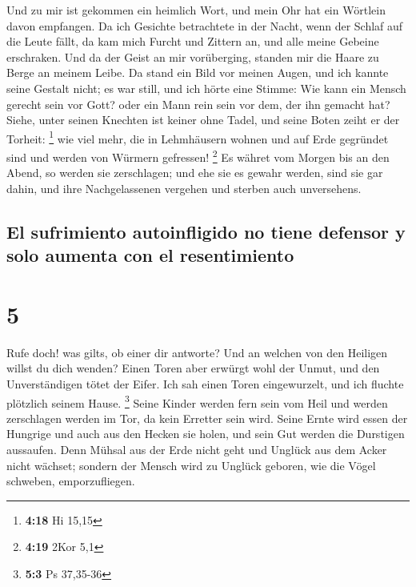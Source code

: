  Und zu mir ist gekommen ein heimlich Wort, und mein Ohr
hat ein Wörtlein davon empfangen.  Da ich Gesichte
betrachtete in der Nacht, wenn der Schlaf auf die Leute fällt,
 da kam mich Furcht und Zittern an, und alle meine
Gebeine erschraken.  Und da der Geist an mir vorüberging,
standen mir die Haare zu Berge an meinem Leibe.  Da stand
ein Bild vor meinen Augen, und ich kannte seine Gestalt nicht; es war
still, und ich hörte eine Stimme:  Wie kann ein Mensch
gerecht sein vor Gott? oder ein Mann rein sein vor dem, der ihn gemacht
hat?  Siehe, unter seinen Knechten ist keiner ohne Tadel,
und seine Boten zeiht er der Torheit: \footnote{\textbf{4:18} Hi 15,15}
 wie viel mehr, die in Lehmhäusern wohnen und auf Erde
gegründet sind und werden von Würmern gefressen! \footnote{\textbf{4:19}
  2Kor 5,1}  Es währet vom Morgen bis an den Abend, so
werden sie zerschlagen; und ehe sie es gewahr werden, sind sie gar
dahin,  und ihre Nachgelassenen vergehen und sterben auch
unversehens.

\hypertarget{el-sufrimiento-autoinfligido-no-tiene-defensor-y-solo-aumenta-con-el-resentimiento}{%
\subsection{El sufrimiento autoinfligido no tiene defensor y solo
aumenta con el
resentimiento}\label{el-sufrimiento-autoinfligido-no-tiene-defensor-y-solo-aumenta-con-el-resentimiento}}

\hypertarget{section-4}{%
\section{5}\label{section-4}}

 Rufe doch! was gilts, ob einer dir antworte? Und an
welchen von den Heiligen willst du dich wenden?  Einen
Toren aber erwürgt wohl der Unmut, und den Unverständigen tötet der
Eifer.  Ich sah einen Toren eingewurzelt, und ich fluchte
plötzlich seinem Hause. \footnote{\textbf{5:3} Ps 37,35-36}
 Seine Kinder werden fern sein vom Heil und werden
zerschlagen werden im Tor, da kein Erretter sein wird. 
Seine Ernte wird essen der Hungrige und auch aus den Hecken sie holen,
und sein Gut werden die Durstigen aussaufen.  Denn Mühsal
aus der Erde nicht geht und Unglück aus dem Acker nicht wächset;
 sondern der Mensch wird zu Unglück geboren, wie die Vögel
schweben, emporzufliegen.

